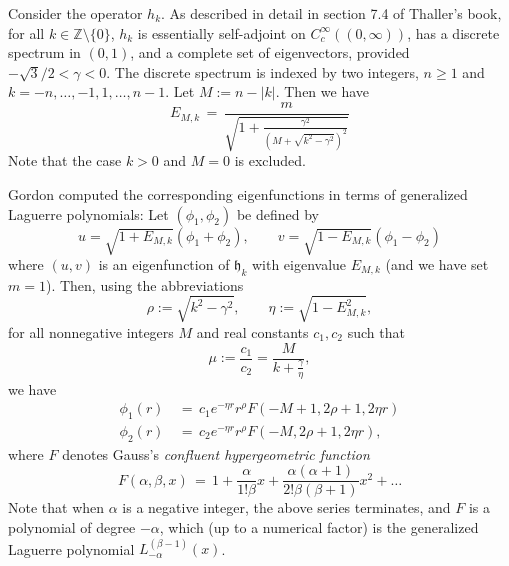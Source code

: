 \documentclass[11 pt]{article}
\renewcommand\({\left(}
\renewcommand\){\right)}
\newcommand\<{\langle}
\renewcommand\>{\rangle}
\newcommand\8{\infty}
\newcommand{\al} {\alpha}\newcommand{\Al}{\Alpha}
\newcommand{\ga} {\gamma}\newcommand{\Ga}{\Gamma}
\newcommand{\Z}{\mathbb{Z}}
\newcommand{\fh}{\mathfrak{h}}
\begin{document}
 Consider the operator $h_k$. As described in detail in section 7.4 of Thaller's book\cite{ThallerBOOK}, for all $k \in \Z\setminus\{0\}$, $h_k$ is essentially self-adjoint on $C^\infty_c((0,\infty))$, has a discrete spectrum in $(0,1)$, and a complete set of eigenvectors,  provided $-\sqrt{3}/2 < \ga < 0$.  The discrete spectrum is indexed by two integers, $n\geq 1$ and $k = -n,\dots,-1,1,\dots,n-1$.  Let $M:= n - |k|$.  Then we have
\begin{equation}\label{eq:SommerfeldSpec}
E_{M,k} \,=\, \frac{m}{\sqrt{ 1+ \frac{\ga^2}{\left(M + \sqrt{ k^2 - \ga^2}\right)^2}}}
\end{equation}
Note that the case $k > 0$ and $M = 0$ is excluded. 

Gordon \cite{Gor28} computed the corresponding eigenfunctions in terms of generalized Laguerre polynomials:  Let $(\phi_1,\phi_2)$ be defined by 
\begin{equation}
u = \sqrt{1+E_{M,k}}(\phi_1+\phi_2),\qquad v = \sqrt{1-E_{M,k}}(\phi_1-\phi_2)
\end{equation}
where $(u,v)$ is an eigenfunction of $\fh_k$ with eigenvalue $E_{M,k}$ (and we have set $m=1$).  Then, using the abbreviations
\begin{equation}
\rho := \sqrt{k^2 - \ga^2},\qquad \eta := \sqrt{1-E_{M,k}^2},
\end{equation}
for all nonnegative integers $M$ and real constants $c_1,c_2$ such that
\begin{equation}
\mu := \frac{c_1}{c_2} = \frac{M}{k + \frac{\ga}{\eta}},
\end{equation}
we have
\begin{align}
\phi_1(r) \,&=\, c_1 e^{-\eta r} r^\rho F(-M+1, 2\rho+1, 2\eta r)\\
\phi_2(r) \,&=\, c_2 e^{-\eta r} r^\rho F(-M,2\rho+1,2\eta r),
\end{align}
where $F$ denotes Gauss\rq{}s {\em confluent hypergeometric function}
\begin{equation}
F(\al,\beta,x) \,=\, 1 + \frac{\al}{1!\beta}x+\frac{\al(\al+1)}{2!\beta(\beta+1)}x^2 + \dots
\end{equation}
Note that when $\al$ is a negative integer, the above series terminates, and $F$ is a polynomial of degree $-\al$, which (up to a numerical factor) is the generalized Laguerre polynomial $L_{-\al}^{(\beta-1)}(x)$.  
\end{document}
